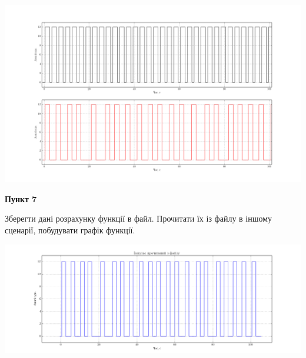 \documentclass[a4paper,12pt]{article}
\begin{document}
\begin{center}
\includegraphics[height = 13 cm,width=16 cm]{6.3.png}
\end{center}



\begin{center}
\textbf{Пункт 7}\par
\end{center}
Зберегти дані розрахунку функції в файл. Прочитати їх із файлу в іншому сценарії, побудувати графік функції.\par


\begin{center}
{\includegraphics[height = 10 cm,width=13 cm]{7readen.png} }\\
\end{center}
\end{document}
